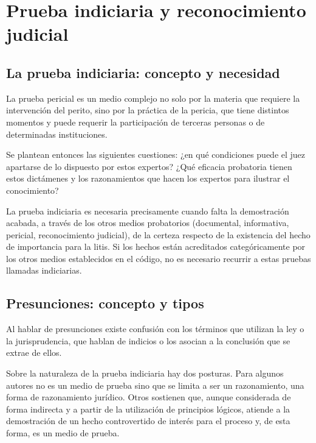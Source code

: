 \documentclass[12pt,oneside]{book}
\begin{document}
\chapter[Prueba indiciaria y reconocimiento judicial]{Prueba indiciaria y reconocimiento judicial}\label{cap:indiciaria}


\section{La prueba indiciaria: concepto y necesidad}

La prueba pericial es un medio complejo no solo por la materia que requiere la intervención del perito, sino por la práctica de la pericia, que tiene distintos momentos y puede requerir la participación de terceras personas o de determinadas instituciones.

Se plantean entonces las siguientes cuestiones: ¿en qué condiciones puede el juez apartarse de lo dispuesto por estos expertos? ¿Qué eficacia probatoria tienen estos dictámenes y los razonamientos que hacen los expertos para ilustrar el conocimiento?

La prueba indiciaria es necesaria precisamente cuando falta la demostración acabada, a través de los otros medios probatorios (documental, informativa, pericial, reconocimiento judicial), de la certeza respecto de la existencia del hecho de importancia para la litis. Si los hechos están acreditados categóricamente por los otros medios establecidos en el código, no es necesario recurrir a estas pruebas llamadas indiciarias.

\section{Presunciones: concepto y tipos}

Al hablar de presunciones existe confusión con los términos que utilizan la ley o la jurisprudencia, que hablan de indicios o los asocian a la conclusión que se extrae de ellos.

Sobre la naturaleza de la prueba indiciaria hay dos posturas. Para algunos autores no es un medio de prueba sino que se limita a ser un razonamiento, una forma de razonamiento jurídico. Otros sostienen que, aunque considerada de forma indirecta y a partir de la utilización de principios lógicos, atiende a la demostración de un hecho controvertido de interés para el proceso y, de esta forma, es un medio de prueba.
\end{document}
